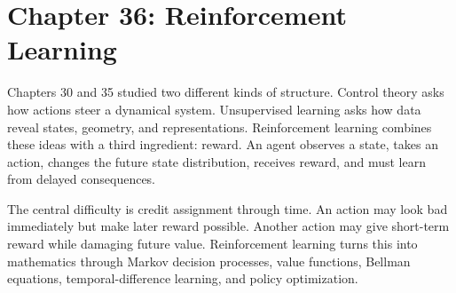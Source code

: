\section{Chapter 36: Reinforcement Learning}
\label{ch:reinforcement-learning}

Chapters 30 and 35 studied two different kinds of structure. Control theory asks how actions steer a dynamical system. Unsupervised learning asks how data reveal states, geometry, and representations. Reinforcement learning combines these ideas with a third ingredient: reward. An agent observes a state, takes an action, changes the future state distribution, receives reward, and must learn from delayed consequences.

The central difficulty is credit assignment through time. An action may look bad immediately but make later reward possible. Another action may give short-term reward while damaging future value. Reinforcement learning turns this into mathematics through Markov decision processes, value functions, Bellman equations, temporal-difference learning, and policy optimization.

